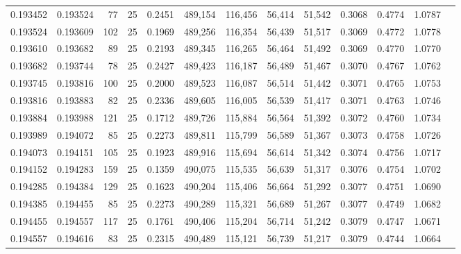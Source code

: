 \begin{tabular}{rrrrrrrrrrrrr}
0.193452 & 0.193524 &    77 &  25 &                                     0.2451 & 489,154 & 116,456 &  56,414 &  51,542 & 0.3068 & 0.4774 & 1.0787 \\
0.193524 & 0.193609 &   102 &  25 &                                     0.1969 & 489,256 & 116,354 &  56,439 &  51,517 & 0.3069 & 0.4772 & 1.0778 \\
0.193610 & 0.193682 &    89 &  25 &                                     0.2193 & 489,345 & 116,265 &  56,464 &  51,492 & 0.3069 & 0.4770 & 1.0770 \\
0.193682 & 0.193744 &    78 &  25 &                                     0.2427 & 489,423 & 116,187 &  56,489 &  51,467 & 0.3070 & 0.4767 & 1.0762 \\
0.193745 & 0.193816 &   100 &  25 &                                     0.2000 & 489,523 & 116,087 &  56,514 &  51,442 & 0.3071 & 0.4765 & 1.0753 \\
0.193816 & 0.193883 &    82 &  25 &                                     0.2336 & 489,605 & 116,005 &  56,539 &  51,417 & 0.3071 & 0.4763 & 1.0746 \\
0.193884 & 0.193988 &   121 &  25 &                                     0.1712 & 489,726 & 115,884 &  56,564 &  51,392 & 0.3072 & 0.4760 & 1.0734 \\
0.193989 & 0.194072 &    85 &  25 &                                     0.2273 & 489,811 & 115,799 &  56,589 &  51,367 & 0.3073 & 0.4758 & 1.0726 \\
0.194073 & 0.194151 &   105 &  25 &                                     0.1923 & 489,916 & 115,694 &  56,614 &  51,342 & 0.3074 & 0.4756 & 1.0717 \\
0.194152 & 0.194283 &   159 &  25 &                                     0.1359 & 490,075 & 115,535 &  56,639 &  51,317 & 0.3076 & 0.4754 & 1.0702 \\
0.194285 & 0.194384 &   129 &  25 &                                     0.1623 & 490,204 & 115,406 &  56,664 &  51,292 & 0.3077 & 0.4751 & 1.0690 \\
0.194385 & 0.194455 &    85 &  25 &                                     0.2273 & 490,289 & 115,321 &  56,689 &  51,267 & 0.3077 & 0.4749 & 1.0682 \\
0.194455 & 0.194557 &   117 &  25 &                                     0.1761 & 490,406 & 115,204 &  56,714 &  51,242 & 0.3079 & 0.4747 & 1.0671 \\
0.194557 & 0.194616 &    83 &  25 &                                     0.2315 & 490,489 & 115,121 &  56,739 &  51,217 & 0.3079 & 0.4744 & 1.0664 \\

\end{tabular}
